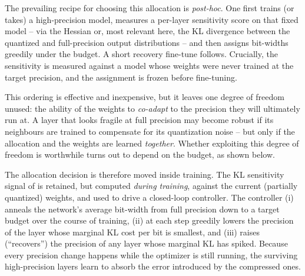 \documentclass[conference]{IEEEtran}
\begin{document}
The prevailing recipe for choosing this allocation is \emph{post-hoc}. One first
trains (or takes) a high-precision model, measures a per-layer sensitivity score
on that fixed model -- via the Hessian \cite{hawq} or, most relevant here, the KL
divergence between the quantized and full-precision output distributions
\cite{kllens} -- and then assigns bit-widths greedily under the budget. A short recovery fine-tune follows. Crucially, the
sensitivity is measured against a model whose weights were never trained at the
target precision, and the assignment is frozen before fine-tuning.

This ordering is effective and inexpensive, but it leaves one degree of freedom
unused: the ability of the weights to \emph{co-adapt} to the precision they will
ultimately run at. A layer that looks fragile at full precision may become robust
if its neighbours are trained to compensate for its quantization noise -- but only
if the allocation and the weights are learned \emph{together}. Whether exploiting
this degree of freedom is worthwhile turns out to depend on the budget, as shown below.

The allocation decision is therefore moved inside training. The KL
sensitivity signal of \cite{kllens} is retained, but computed \emph{during training}, against the
current (partially quantized) weights, and used to drive a closed-loop
controller. The controller (i) anneals the network's average bit-width from full
precision down to a target budget over the course of training, (ii) at each step
greedily lowers the precision of the layer whose marginal KL cost per bit is
smallest, and (iii) raises (``recovers'') the precision of any layer whose marginal
KL has spiked. Because every precision change happens while the optimizer is
still running, the surviving high-precision layers learn to absorb the error
introduced by the compressed ones.
\end{document}
